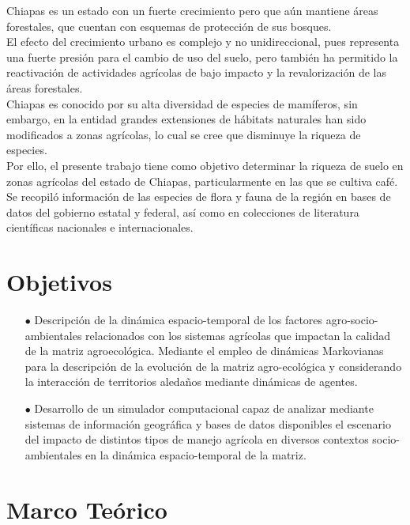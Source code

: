 Chiapas es un estado con un fuerte crecimiento pero que aún mantiene áreas forestales, que cuentan con esquemas de protección de sus bosques.\\

El efecto del crecimiento urbano es complejo y no unidireccional, pues representa una fuerte presión para el cambio de uso del suelo, pero también ha permitido la reactivación de actividades agrícolas de bajo impacto y la revalorización de las áreas forestales.\\

Chiapas es conocido por su alta diversidad de especies de mamíferos, sin embargo, en la entidad grandes extensiones de hábitats naturales han sido modificados a zonas agrícolas, lo cual se cree que disminuye la riqueza de especies.\\

Por ello, el presente trabajo tiene como objetivo determinar la riqueza de suelo en zonas agrícolas del estado de Chiapas, particularmente en las que se cultiva café. Se recopiló información de las especies de flora y fauna de la región en bases de datos del gobierno estatal y federal, así como en colecciones de literatura científicas nacionales e internacionales.

\section{Objetivos}

\begin{itemize}
\item[$\bullet$] Descripción de la dinámica espacio-temporal de los factores agro-socio-ambientales relacionados con los sistemas agrícolas que impactan la calidad de la matriz agroecológica. Mediante el empleo de dinámicas Markovianas para la descripción de la evolución de la matriz agro-ecológica y considerando la interacción de territorios aledaños mediante dinámicas de agentes.
\item[$\bullet$] Desarrollo de un simulador computacional capaz de analizar mediante sistemas de información geográfica y bases de datos disponibles el escenario del impacto de distintos tipos de manejo agrícola en diversos contextos socio- ambientales en la dinámica espacio-temporal de la matriz.
\end{itemize}

\section{Marco Teórico}
